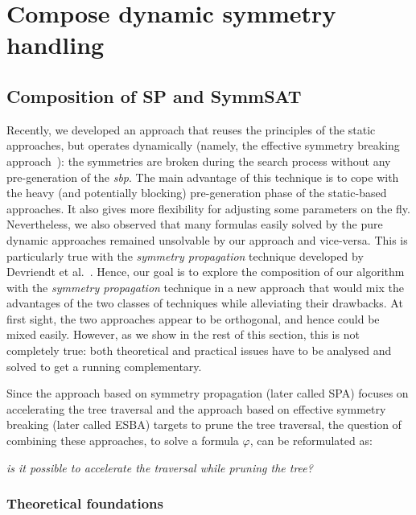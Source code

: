 \chapter{Compose dynamic symmetry handling}


\section{Composition of SP and SymmSAT}

Recently, we developed an approach that reuses the
principles of the static approaches, but operates dynamically (namely, the effective symmetry breaking approach~\cite{metin2018cdclsym}):
 the symmetries are broken during the search process without any pre-generation of the \textit{sbp}. The main
advantage of this technique is to cope with the heavy (and potentially
blocking) pre-generation phase of the static-based approaches. It also gives
more flexibility for adjusting some parameters on the fly. 
Nevertheless, we also observed that many formulas easily solved by the pure
dynamic approaches remained unsolvable by our approach and vice-versa. This is
particularly true with the \textit{symmetry propagation} technique developed by
Devriendt et al.~\cite{Devriendt12}.
Hence, our goal is to explore the composition of our algorithm with the  \textit{symmetry propagation} technique in
a new approach that would mix the advantages of the two classes of techniques while alleviating their drawbacks. At first sight,
the two approaches appear to be orthogonal, and hence could be mixed easily. However, as we show in the rest of this section,
this is not completely true: both theoretical and practical issues have to be analysed and solved to get a
running complementary. 


Since the approach based on symmetry propagation (later called SPA) focuses on
accelerating the tree traversal and the approach based on effective symmetry
breaking (later called ESBA) targets to prune the tree traversal, the question of combining these approaches, to solve a formula $\varphi$, can
be reformulated as: 

\begin{center}
	\textit{is it possible to accelerate the traversal while pruning the tree?}
\end{center}


\subsection{Theoretical foundations}
\label{sec:tf}

